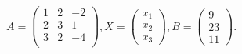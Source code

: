\documentclass[12pt]{article}
\begin{document}
$ \begin{equation*}A=\begin{pmatrix}1 & 2 & -2 \\2 & 3 & 1 \\3 & 2 & -4 \\\end{pmatrix}, X=\begin{pmatrix}x_1 \\x_2 \\x_3\end{pmatrix}, B = \begin{pmatrix}9 \\23 \\11\end{pmatrix}.\end{equation*} $
\end{document}
